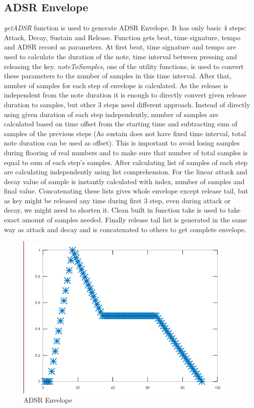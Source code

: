 \documentclass[12pt, a4paper]{article}
\begin{document}
\subsection{ADSR Envelope}

\textit{getADSR} function is used to generate ADSR Envelope. It has only basic 4 steps: Attack, Decay, Sustain and Release. Function gets beat, time signature, tempo and ADSR record as parameters. At first beat, time signature and tempo are used to calculate the duration of the note, time interval between pressing and releasing the key. \textit{noteToSamples}, one of the utility functions, is used to convert these parameters to the number of samples in this time interval. After that, number of samples for each step of envelope is calculated. As the release is independent from the note duration it is enough to directly convert given release duration to samples, but other 3 steps need different approach. Instead of directly using given duration of each step independently, number of samples are calculated based on time offset from the starting time and subtracting sum of samples of the previous steps (As sustain does not have fixed time interval, total note duration can be used as offset). This is important to avoid losing samples during flooring of real numbers and to make sure that number of total samples is equal to sum of each step’s samples. After calculating list of samples of each step are calculating independently using list comprehension. For the linear attack and decay value of sample is instantly calculated with index, number of samples and final value. Concatenating these lists gives whole envelope except release tail, but as key might be released any time during first 3 step, even during attack or decay, we might need to shorten it. Clean built in function take is used to take exact amount of samples needed. Finally release tail list is generated in the same way as attack and decay and is concatenated to others to get complete envelope. 

\begin{figure}[ht!]
\centering
\includegraphics[scale=0.3]{env1}
\caption{ADSR Envelope}
\end{figure}
\end{document}
